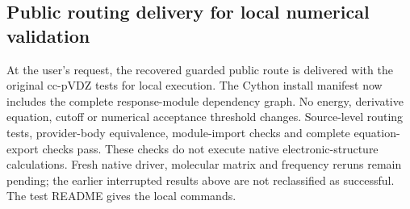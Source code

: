 \documentclass[11pt]{article}
\begin{document}
\subsection{Public routing delivery for local numerical validation}
At the user's request, the recovered guarded public route is delivered with
the original cc-pVDZ tests for local execution. The Cython install manifest
now includes the complete response-module dependency graph. No energy,
derivative equation, cutoff or numerical acceptance threshold changes.
Source-level routing tests, provider-body equivalence, module-import checks
and complete equation-export checks pass. These checks do not execute native
electronic-structure calculations. Fresh native driver, molecular matrix and
frequency reruns remain pending; the earlier interrupted results above are
not reclassified as successful. The test README gives the local commands.
\end{document}
